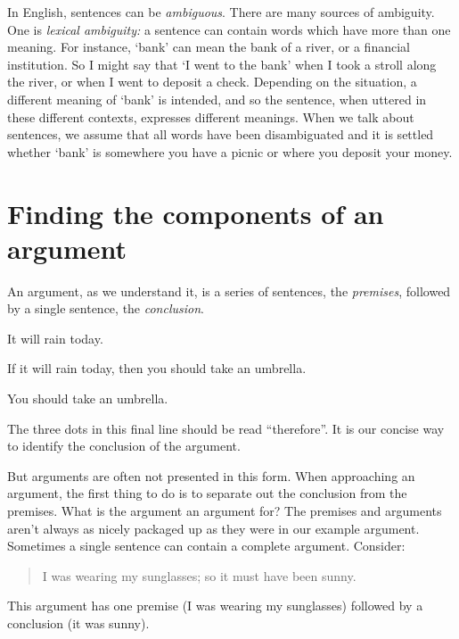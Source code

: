 
In English, sentences can be \emph{ambiguous}. There are many sources of ambiguity. One is \emph{lexical ambiguity:} a sentence can contain words which have more than one meaning.  For instance, `bank' can mean the bank of a river, or a financial institution. So I might say that `I went to the bank' when I took a stroll along the river, or when I went to deposit a check.  Depending on the situation, a different meaning of `bank' is intended, and so the sentence, when uttered in these different contexts, expresses different meanings. When we talk about sentences, we assume that all words have been disambiguated and it is settled whether `bank' is somewhere you have a picnic or where you deposit your money. 




\section{Finding the components of an argument}


An argument, as we understand it, is a series of sentences, the \emph{premises}, followed by a single sentence, the \emph{conclusion}. 

\begin{earg}\label{argRaining}
	\item[] It will rain today.
	\item[] If it will rain today, then you should take an umbrella. 
	\item[\therefore] You should take an umbrella.
\end{earg}
The three dots in this final line should be read ``therefore''. It is our concise way to identify the conclusion of the argument. 

But arguments are often not presented in this form. 
When approaching an argument, the first thing to do is to separate out the conclusion from the premises. What is the argument an argument for?
The premises and arguments aren't always as nicely packaged up as they were in our example argument. Sometimes a single sentence can contain a complete argument. Consider:
	\begin{quote}
		 I was wearing my sunglasses; so it must have been sunny.
	\end{quote}
This argument has one premise (I was wearing my sunglasses) followed by a conclusion (it was sunny). 


